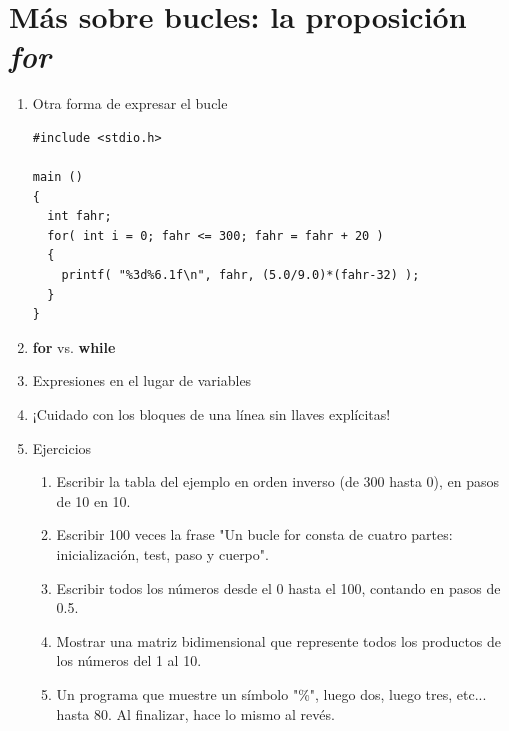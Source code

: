 \documentclass[a4paper,oneside]{article}
\begin{document}
\section{Más sobre bucles: la proposición \textit{for}}
  \begin{enumerate}
  \item Otra forma de expresar el bucle

    \begin{verbatim}
#include <stdio.h>

main ()
{
  int fahr;
  for( int i = 0; fahr <= 300; fahr = fahr + 20 )
  {
    printf( "%3d%6.1f\n", fahr, (5.0/9.0)*(fahr-32) );
  }
}
    \end{verbatim}
  \item \textbf{for} vs. \textbf{while}
  \item Expresiones en el lugar de variables
  \item ¡Cuidado con los bloques de una línea sin llaves explícitas!
  \item Ejercicios
    \begin{enumerate}
    \item Escribir la tabla del ejemplo en orden inverso (de 300 hasta 0), en pasos de 10 en 10.
    \item Escribir 100 veces la frase "Un bucle for consta de cuatro partes: inicialización, test, paso y cuerpo".
    \item Escribir todos los números desde el 0 hasta el 100, contando en pasos de 0.5.
    \item Mostrar una matriz bidimensional que represente todos los productos de los números del 1 al 10.
    \item Un programa que muestre un símbolo "\%", luego dos, luego tres, etc... hasta 80. Al finalizar, hace lo mismo al revés.
    \end{enumerate}
  \end{enumerate}
\end{document}
